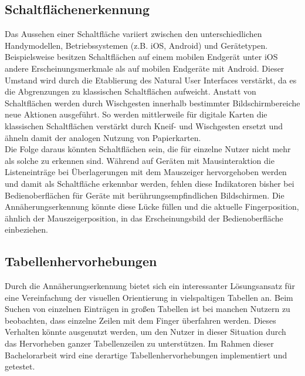 \documentclass[12pt,numbers=noenddot,parskip,bibliography=totocnumbered,listof=totocnumbered]{scrreprt}
\begin{document}
\subsection{Schaltflächenerkennung}\label{sec:schaltflächenerkennung}
Das Aussehen einer Schaltfläche variiert zwischen den unterschiedlichen Handymodellen, Betriebssystemen (z.B. iOS, Android) und Gerätetypen. Beispielsweise besitzen Schaltflächen auf einem mobilen Endgerät unter iOS andere Erscheinungsmerkmale als auf mobilen Endgeräte mit Android. Dieser Umstand wird durch die Etablierung des Natural User Interfaces \citep{nui} verstärkt, da es die Abgrenzungen zu klassischen Schaltflächen aufweicht. Anstatt von Schaltflächen werden durch Wischgesten innerhalb bestimmter Bildschirmbereiche neue Aktionen ausgeführt. So werden mittlerweile für digitale Karten die klassischen Schaltflächen verstärkt durch Kneif- und Wischgesten ersetzt und ähneln damit der analogen Nutzung von Papierkarten.\\
Die Folge daraus könnten Schaltflächen sein, die für einzelne Nutzer nicht mehr als solche zu erkennen sind. Während auf Geräten mit Mausinteraktion die Listeneinträge bei Überlagerungen mit dem Mauszeiger hervorgehoben werden und damit als Schaltfläche erkennbar werden, fehlen diese Indikatoren bisher bei Bedienoberflächen für Geräte mit berührungsempfindlichen Bildschirmen. Die Annäherungserkennung könnte diese Lücke füllen und die aktuelle Fingerposition, ähnlich der Mauszeigerposition, in das Erscheinungsbild der Bedienoberfläche einbeziehen.

\subsection{Tabellenhervorhebungen}
Durch die Annäherungserkennung bietet sich ein interessanter Lösungsansatz für eine Vereinfachung der visuellen Orientierung in vielspaltigen Tabellen an. Beim Suchen von einzelnen Einträgen in großen Tabellen ist bei manchen Nutzern zu beobachten, dass einzelne Zeilen mit dem Finger überfahren werden. Dieses Verhalten könnte ausgenutzt werden, um den Nutzer in dieser Situation durch das Hervorheben ganzer Tabellenzeilen zu unterstützen. Im Rahmen dieser Bachelorarbeit wird eine derartige Tabellenhervorhebungen implementiert und getestet.
\end{document}
